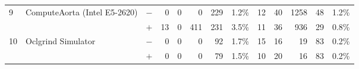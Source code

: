 \begin{tabular}{lll | rrrrr | rrrrr }
\hline
\multirow{ 2}{*}{9} & \multirow{ 2}{*}{ComputeAorta (Intel E5-2620)} & $-$ & 0 & 0 & 0 & 229 & 1.2\%       & 12 & 40 & 1258 & 48 & 1.2\% \\& & $+$ & 13 & 0 & 411 & 231 & 3.5\% & 11 & 36 & 936 & 29 & 0.8\% \\
\hline
\multirow{ 2}{*}{10} & \multirow{ 2}{*}{Oclgrind Simulator} & $-$ & 0 & 0 & 0 & 92 & 1.7\%       & 15 & 16 & 19 & 83 & 0.2\% \\& & $+$ & 0 & 0 & 0 & 79 & 1.5\% & 10 & 20 & 16 & 83 & 0.2\% \\
  \bottomrule
\end{tabular}

